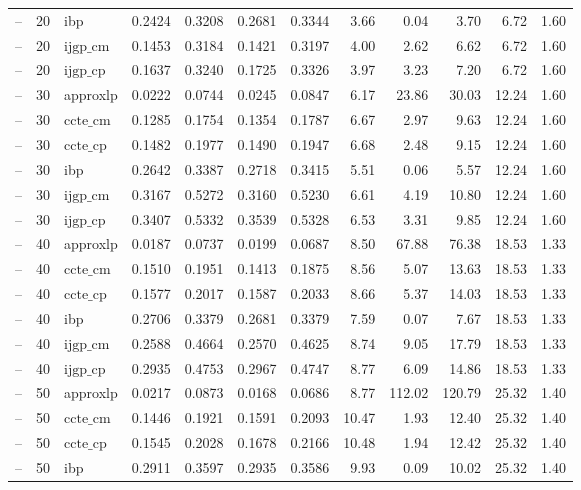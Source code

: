 \begin{table}[ht]
\begin{tabular}{lrlrrrrrrrrr}
-- & 20 & ibp & 0.2424 & 0.3208 & 0.2681 & 0.3344 & 3.66 & 0.04 & 3.70 & 6.72 & 1.60 \\
-- & 20 & $\text{ijgp\_cm}$ & 0.1453 & 0.3184 & 0.1421 & 0.3197 & 4.00 & 2.62 & 6.62 & 6.72 & 1.60 \\
-- & 20 & $\text{ijgp\_cp}$ & 0.1637 & 0.3240 & 0.1725 & 0.3326 & 3.97 & 3.23 & 7.20 & 6.72 & 1.60 \\
-- & 30 & approxlp & 0.0222 & 0.0744 & 0.0245 & 0.0847 & 6.17 & 23.86 & 30.03 & 12.24 & 1.60 \\
-- & 30 & $\text{ccte\_cm}$ & 0.1285 & 0.1754 & 0.1354 & 0.1787 & 6.67 & 2.97 & 9.63 & 12.24 & 1.60 \\
-- & 30 & $\text{ccte\_cp}$ & 0.1482 & 0.1977 & 0.1490 & 0.1947 & 6.68 & 2.48 & 9.15 & 12.24 & 1.60 \\
-- & 30 & ibp & 0.2642 & 0.3387 & 0.2718 & 0.3415 & 5.51 & 0.06 & 5.57 & 12.24 & 1.60 \\
-- & 30 & $\text{ijgp\_cm}$ & 0.3167 & 0.5272 & 0.3160 & 0.5230 & 6.61 & 4.19 & 10.80 & 12.24 & 1.60 \\
-- & 30 & $\text{ijgp\_cp}$ & 0.3407 & 0.5332 & 0.3539 & 0.5328 & 6.53 & 3.31 & 9.85 & 12.24 & 1.60 \\
-- & 40 & approxlp & 0.0187 & 0.0737 & 0.0199 & 0.0687 & 8.50 & 67.88 & 76.38 & 18.53 & 1.33 \\
-- & 40 & $\text{ccte\_cm}$ & 0.1510 & 0.1951 & 0.1413 & 0.1875 & 8.56 & 5.07 & 13.63 & 18.53 & 1.33 \\
-- & 40 & $\text{ccte\_cp}$ & 0.1577 & 0.2017 & 0.1587 & 0.2033 & 8.66 & 5.37 & 14.03 & 18.53 & 1.33 \\
-- & 40 & ibp & 0.2706 & 0.3379 & 0.2681 & 0.3379 & 7.59 & 0.07 & 7.67 & 18.53 & 1.33 \\
-- & 40 & $\text{ijgp\_cm}$ & 0.2588 & 0.4664 & 0.2570 & 0.4625 & 8.74 & 9.05 & 17.79 & 18.53 & 1.33 \\
-- & 40 & $\text{ijgp\_cp}$ & 0.2935 & 0.4753 & 0.2967 & 0.4747 & 8.77 & 6.09 & 14.86 & 18.53 & 1.33 \\
-- & 50 & approxlp & 0.0217 & 0.0873 & 0.0168 & 0.0686 & 8.77 & 112.02 & 120.79 & 25.32 & 1.40 \\
-- & 50 & $\text{ccte\_cm}$ & 0.1446 & 0.1921 & 0.1591 & 0.2093 & 10.47 & 1.93 & 12.40 & 25.32 & 1.40 \\
-- & 50 & $\text{ccte\_cp}$ & 0.1545 & 0.2028 & 0.1678 & 0.2166 & 10.48 & 1.94 & 12.42 & 25.32 & 1.40 \\
-- & 50 & ibp & 0.2911 & 0.3597 & 0.2935 & 0.3586 & 9.93 & 0.09 & 10.02 & 25.32 & 1.40 \\

\end{tabular}
\end{table}
